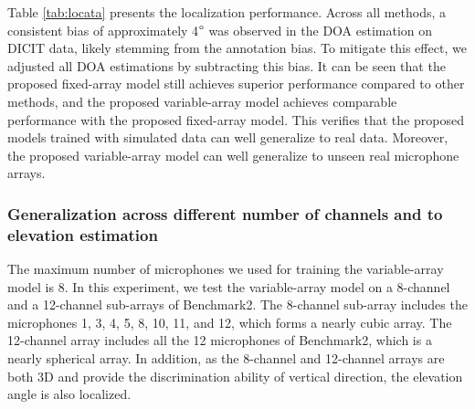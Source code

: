 \documentclass[lettersize,journal]{IEEEtran}
\begin{document}

Table \ref{tab:locata} presents the localization performance. 
Across all methods, a consistent bias of approximately 4$\degree$ was observed in the DOA estimation on DICIT data, likely stemming from the annotation bias. To mitigate this effect, we adjusted all DOA estimations by subtracting this bias. It can be seen that the proposed fixed-array model still achieves superior performance compared to other methods, and the proposed variable-array model achieves comparable performance with the proposed fixed-array model. This verifies that the proposed models trained with simulated data can well generalize to real data. Moreover, the proposed variable-array model can well generalize to unseen real microphone arrays.  


\subsubsection{Generalization across different number of channels and to elevation estimation} The maximum number of microphones we used for training the variable-array model is 8. In this experiment, we test the variable-array model on a 8-channel and a 12-channel sub-arrays of Benchmark2.  The 8-channel sub-array includes the microphones 1, 3, 4, 5, 8, 10, 11, and 12, which forms a nearly cubic array. The 12-channel array includes all the 12 microphones of Benchmark2, which is a nearly spherical array. In addition, as the 8-channel and 12-channel arrays are both 3D and provide the discrimination ability of vertical direction, the elevation angle is also localized. 
\end{document}
